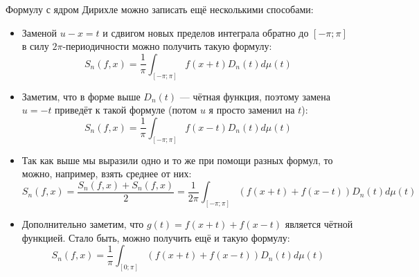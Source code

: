 \begin{note}
	Формулу с ядром Дирихле можно записать ещё несколькими способами:
	\begin{itemize}
		\item Заменой $u - x = t$ и сдвигом новых пределов интеграла обратно до $[-\pi; \pi]$ в силу $2\pi$-периодичности можно получить такую формулу:
		\[
			S_n(f, x) = \frac{1}{\pi} \int_{[-\pi; \pi]} f(x + t)D_n(t)d\mu(t)
		\]
		
		\item Заметим, что в форме выше $D_n(t)$ --- чётная функция, поэтому замена $u = -t$ приведёт к такой формуле (потом $u$ я просто заменил на $t$):
		\[
			S_n(f, x) = \frac{1}{\pi} \int_{[-\pi; \pi]} f(x - t)D_n(t)d\mu(t)
		\]
		
		\item Так как выше мы выразили одно и то же при помощи разных формул, то можно, например, взять среднее от них:
		\[
			S_n(f, x) = \frac{S_n(f, x) + S_n(f, x)}{2} = \frac{1}{2\pi} \int_{[-\pi; \pi]} (f(x + t) + f(x - t))D_n(t)d\mu(t)
		\]
		
		\item Дополнительно заметим, что $g(t) = f(x + t) + f(x - t)$ является чётной функцией. Стало быть, можно получить ещё и такую формулу:
		\[
			S_n(f, x) = \frac{1}{\pi} \int_{[0; \pi]} (f(x + t) + f(x - t))D_n(t)d\mu(t)
		\]
	\end{itemize}
\end{note}